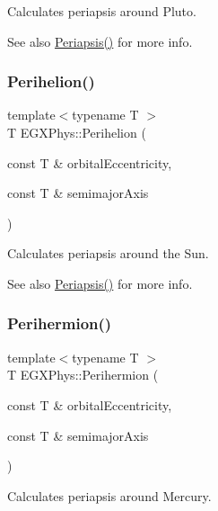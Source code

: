 Calculates periapsis around Pluto. 

\begin{DoxySeeAlso}{See also}
\hyperlink{group___astrophysics_ga4414ac75539371ec874a3d25cad6c9fe}{Periapsis()} for more info. 
\end{DoxySeeAlso}
\mbox{\label{group___astrophysics_ga941d285e3a0b48ada9c9f60925ff63c2}} 
\subsubsection{\texorpdfstring{Perihelion()}{Perihelion()}}
{\footnotesize\ttfamily template$<$typename T $>$ \\
T E\+G\+X\+Phys\+::\+Perihelion (\begin{DoxyParamCaption}\item[{const T \&}]{orbital\+Eccentricity,  }\item[{const T \&}]{semimajor\+Axis }\end{DoxyParamCaption})}



Calculates periapsis around the Sun. 

\begin{DoxySeeAlso}{See also}
\hyperlink{group___astrophysics_ga4414ac75539371ec874a3d25cad6c9fe}{Periapsis()} for more info. 
\end{DoxySeeAlso}
\mbox{\label{group___astrophysics_ga9562e9cbfd73019ae9cdaa643b843d63}} 
\subsubsection{\texorpdfstring{Perihermion()}{Perihermion()}}
{\footnotesize\ttfamily template$<$typename T $>$ \\
T E\+G\+X\+Phys\+::\+Perihermion (\begin{DoxyParamCaption}\item[{const T \&}]{orbital\+Eccentricity,  }\item[{const T \&}]{semimajor\+Axis }\end{DoxyParamCaption})}



Calculates periapsis around Mercury. 

